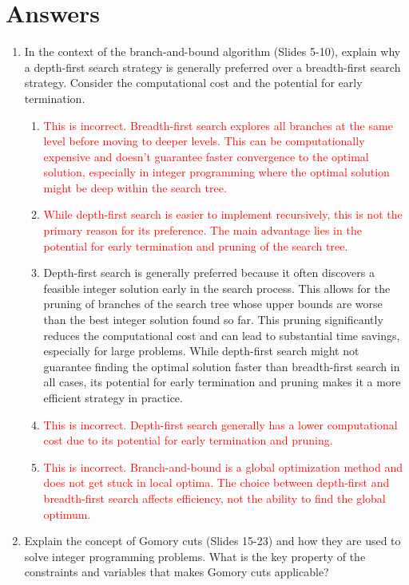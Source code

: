 \documentclass{article}%
\newcommand{\incorrect}[1]{\textcolor{red}{#1}}
\begin{document}
\section{Answers}%
\label{sec:Answers}%
\begin{enumerate}%
\item In the context of the branch-and-bound algorithm (Slides 5-10), explain why a depth-first search strategy is generally preferred over a breadth-first search strategy.  Consider the computational cost and the potential for early termination.%
\begin{enumerate}%
\item \incorrect{This is incorrect.  Breadth-first search explores all branches at the same level before moving to deeper levels. This can be computationally expensive and doesn't guarantee faster convergence to the optimal solution, especially in integer programming where the optimal solution might be deep within the search tree.}%
\item \incorrect{While depth-first search is easier to implement recursively, this is not the primary reason for its preference. The main advantage lies in the potential for early termination and pruning of the search tree.}%
\item Depth-first search is generally preferred because it often discovers a feasible integer solution early in the search process. This allows for the pruning of branches of the search tree whose upper bounds are worse than the best integer solution found so far. This pruning significantly reduces the computational cost and can lead to substantial time savings, especially for large problems.  While depth-first search might not guarantee finding the optimal solution faster than breadth-first search in all cases, its potential for early termination and pruning makes it a more efficient strategy in practice.%
\item \incorrect{This is incorrect. Depth-first search generally has a lower computational cost due to its potential for early termination and pruning.}%
\item \incorrect{This is incorrect. Branch-and-bound is a global optimization method and does not get stuck in local optima. The choice between depth-first and breadth-first search affects efficiency, not the ability to find the global optimum.}%
\end{enumerate}%
\vspace{1em}%
\item Explain the concept of Gomory cuts (Slides 15-23) and how they are used to solve integer programming problems.  What is the key property of the constraints and variables that makes Gomory cuts applicable?%

\end{enumerate}
\end{document}
